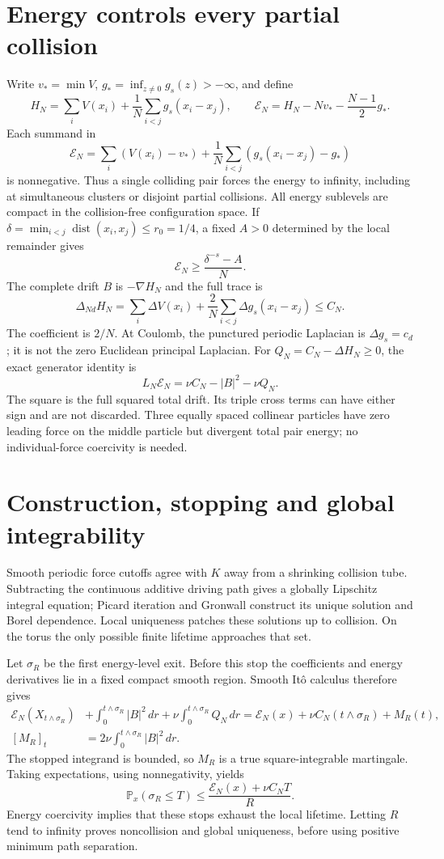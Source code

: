 \documentclass[10pt]{article}
\newcommand{\Pp}{\mathbb P}
\begin{document}
\section*{Energy controls every partial collision}
Write $v_*=\min V$, $g_*=\inf_{z\ne0}g_s(z)>-\infty$, and define
\[
 H_N=\sum_iV(x_i)+\frac1N\sum_{i<j}g_s(x_i-x_j),\qquad
 \mathcal E_N=H_N-Nv_*-\frac{N-1}{2}g_*.
\]
Each summand in
\[
 \mathcal E_N=\sum_i(V(x_i)-v_*)+
        \frac1N\sum_{i<j}(g_s(x_i-x_j)-g_*)
\]
is nonnegative. Thus a single colliding pair forces the energy to infinity,
including at simultaneous clusters or disjoint partial collisions. All energy
sublevels are compact in the collision-free configuration space. If
$\delta=\min_{i<j}\operatorname{dist}(x_i,x_j)\le r_0=1/4$, a fixed
$A>0$ determined by the local remainder gives
\[
 \mathcal E_N\ge\frac{\delta^{-s}-A}{N}.
\]
The complete drift $B$ is $-\nabla H_N$ and the full trace is
\[
 \Delta_{Nd}H_N=\sum_i\Delta V(x_i)+\frac2N\sum_{i<j}\Delta g_s(x_i-x_j)
 \le C_N.
\]
The coefficient is $2/N$. At Coulomb, the punctured periodic Laplacian is
$\Delta g_s=c_d$; it is not the zero Euclidean principal Laplacian.
For $Q_N=C_N-\Delta H_N\ge0$, the exact generator identity is
\[
 L_N\mathcal E_N=\nu C_N-|B|^2-\nu Q_N.
\]
The square is the full squared total drift. Its triple cross terms can have
either sign and are not discarded. Three equally spaced collinear particles
have zero leading force on the middle particle but divergent total pair energy;
no individual-force coercivity is needed.

\section*{Construction, stopping and global integrability}
Smooth periodic force cutoffs agree with $K$ away from a shrinking collision
tube. Subtracting the continuous additive driving path gives a globally
Lipschitz integral equation; Picard iteration and Gronwall construct its unique
solution and Borel dependence. Local uniqueness patches these solutions up to
collision. On the torus the only possible finite lifetime approaches that set.

Let $\sigma_R$ be the first energy-level exit. Before this stop the coefficients
and energy derivatives lie in a fixed compact smooth region. Smooth It\^o
calculus therefore gives
\begin{align*}
 \mathcal E_N(X_{t\wedge\sigma_R})
 &+\int_0^{t\wedge\sigma_R}|B|^2\,dr
 +\nu\int_0^{t\wedge\sigma_R}Q_N\,dr
 =\mathcal E_N(x)+\nu C_N(t\wedge\sigma_R)+M_R(t),\\
 [M_R]_t&=2\nu\int_0^{t\wedge\sigma_R}|B|^2\,dr.
\end{align*}
The stopped integrand is bounded, so $M_R$ is a true square-integrable
martingale. Taking expectations, using nonnegativity, yields
\[
 \Pp_x(\sigma_R\le T)\le\frac{\mathcal E_N(x)+\nu C_NT}{R}.
\]
Energy coercivity implies that these stops exhaust the local lifetime.
Letting $R$ tend to infinity proves noncollision and global uniqueness, before
using positive minimum path separation.
\end{document}
